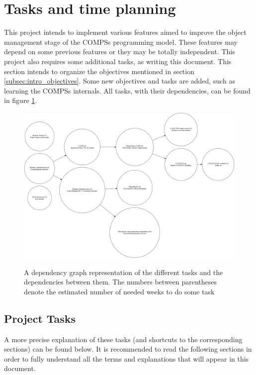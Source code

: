 \section{Tasks and time planning}
\label{sec:tasks_and_time_planning}
This project intends to implement various features aimed to improve the object management stage of the COMPSs programming model. These features may depend on some previous features or they may be totally independent. This project also requires some additional tasks, as writing this document. This section intends to organize the objectives mentioned in section \ref{subsec:intro_objectives}. Some new objectives and tasks are added, such as learning the COMPSs internals. All tasks, with their dependencies, can be found in figure \ref{fig:thesis_task_graph}.

\begin{figure}[ht!]
\includegraphics[scale = 0.20]{figures/thesis_task_graph.png}
\label{fig:thesis_task_graph}
\caption{A dependency graph representation of the different tasks and the dependencies between them. The numbers between parentheses denote the estimated number of needed weeks to do some task}
\end{figure}

\subsection{Project Tasks}
\label{subsec:project_tasks}
A more precise explanation of these tasks (and shortcuts to the corresponding sections) can be found below. It is recommended to read the following sections in order to fully understand all the terms and explanations that will appear in this document.

